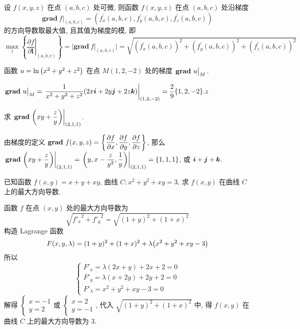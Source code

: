 \begin{theorem}[方向导数与梯度的关系]
    设 $ f(x, y, z) $ 在点 $ (a, b, c) $ 处可微, 则函数 $ f(x, y, z) $ 在点 $ (a, b, c) $ 处沿梯度
    $$\left.\mathbf{grad}~ f\right|_{(a, b, c)}=\left(f_{x}^{\prime}(a, b, c), f_{y}^{\prime}(a, b, c), f_{z}^{\prime}(a, b, c)\right)$$
    的方向导数取最大值, 且其值为梯度的模, 即
    $$\max _{l}\left\{\left.\frac{\partial f}{\partial \boldsymbol{l}}\right|_{(a, b, c)}\right\}=|\mathbf{grad}~ f|_{(a, b, c)} \mid =\sqrt{\left(f_{x}^{\prime}(a, b, c)\right)^{2}+\left(f_{y}^{\prime}(a, b, c)\right)^{2}+\left(f_{z}^{\prime}(a, b, c)\right)^{2}}$$
\end{theorem}

\begin{example}[1992 数一]
    函数 $u=\ln\qty(x^2+y^2+z^2)$ 在点 $M(1,2,-2)$ 处的梯度 $\eval{\mathbf{grad}~u}_{M}.$
\end{example}
\begin{solution}
    $\eval{\mathbf{grad}~u}_{M}=\eval{\dfrac{1}{x^2+y^2+z^2}(2x\vb*{i}+2y\vb*{j}+2z\vb*{k})}_{(1,2,-2)}=\dfrac{2}{9}\qty{1,2,-2}.z$
\end{solution}

\begin{example}[2012 数一]
    求 $\eval{\mathbf{grad}~\qty(xy+\dfrac{z}{y})}_{(2,1,1)}$.
\end{example}
\begin{solution}
    由梯度的定义 $\displaystyle\mathbf{grad}~f(x,y,z)=\qty{\pdv{f}{x},\pdv{f}{y},\pdv{f}{z}}$, 那么
    $\eval{\mathbf{grad}~\qty(xy+\dfrac{z}{y})}_{(2,1,1)}=\eval{\qty(y,x-\dfrac{z}{y^2},\dfrac{1}{y})}_{(2,1,1)}=\qty{1,1,1}$, 或 $\vb*{i}+\vb*{j}+\vb*{k}.$
\end{solution}

\begin{example}[2015 数一]
    已知函数 $f(x,y)=x+y+xy$, 曲线 $C:x^2+y^2+xy=3$, 求 $f(x,y)$ 在曲线 $C$ 上的最大方向导数.
\end{example}
\begin{solution}
    函数 $f$ 在点 $(x,y)$ 处的最大方向导数为 $$\sqrt{{f'_x}^2+{f'_y}^2}=\sqrt{(1+y)^2+(1+x)^2}$$
    构造 Lagrange 函数 $$F(x,y,\lambda)=(1+y)^2+(1+x)^2+\lambda\qty(x^2+y^2+xy-3)$$ 所以 
    $$\begin{cases}
        F'_x=\lambda (2 x + y) + 2 x + 2=0\\ 
        F'_y=\lambda (x + 2 y) + 2 y + 2=0\\ 
        F'_\lambda=x^2+y^2+xy-3=0
    \end{cases}$$ 解得 $\begin{cases}
        x=-1\\ y=2
    \end{cases}\text{或 }\begin{cases}
        x=2\\ y=-1
    \end{cases}$, 代入 $\sqrt{(1+y)^2+(1+x)^2}$ 中, 得 $f(x,y)$  在曲线 $C$ 上的最大方向导数为 $3$.
\end{solution}

